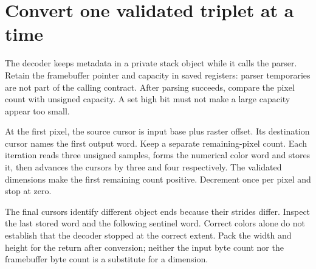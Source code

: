 \section{Convert one validated triplet at a time}
The decoder keeps metadata in a private stack object while it calls the parser. Retain
the framebuffer pointer and capacity in saved registers: parser temporaries are not
part of the calling contract. After parsing succeeds, compare the pixel count with
unsigned capacity. A set high bit must not make a large capacity appear too small.

At the first pixel, the source cursor is input base plus raster offset. Its destination
cursor names the first output word. Keep a separate remaining-pixel count. Each
iteration reads three unsigned samples, forms the numerical color word and stores it,
then advances the cursors by three and four respectively. The validated dimensions
make the first remaining count positive. Decrement once per pixel and stop at zero.

The final cursors identify different object ends because their strides differ. Inspect
the last stored word and the following sentinel word. Correct colors alone do not
establish that the decoder stopped at the correct extent. Pack the width and height
for the return after conversion; neither the input byte count nor the framebuffer byte
count is a substitute for a dimension.
